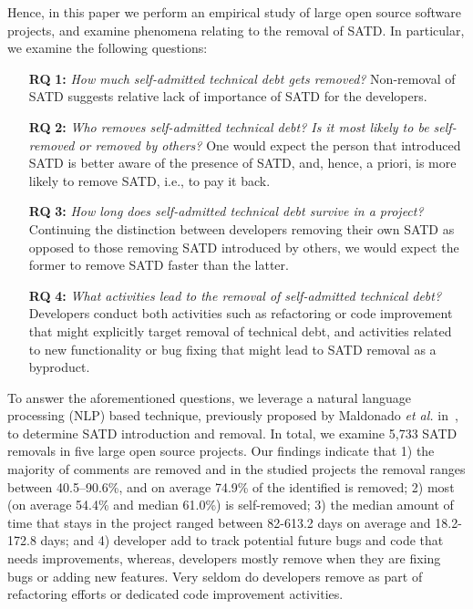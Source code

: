 Hence, in this paper we perform an empirical study of large open source software projects, and examine phenomena relating to the removal of SATD. In particular, we examine the following questions:
\begin{itemize}
	\item[\textbf{RQ}]\textbf{1:} \emph{How much self-admitted technical debt gets removed?} Non-removal of SATD suggests relative lack of importance of SATD for the developers. 
	\item[\textbf{RQ}]\textbf{2:} \emph{Who removes self-admitted technical debt? Is it most likely to be self-removed or removed by others?} One would expect the person that introduced SATD is better aware of the presence of SATD, and, hence, a priori, is more likely to remove SATD, i.e., to pay it back.
	\item[\textbf{RQ}]\textbf{3:} \emph{How long does self-admitted technical debt survive in a project?} Continuing the distinction between developers removing their own SATD as opposed to those removing SATD introduced by others, we would expect the former to remove SATD faster than the latter.
	\item[\textbf{RQ}]\textbf{4:} \emph{What activities lead to the removal of self-admitted technical debt?} Developers conduct both activities such as refactoring or code improvement that might explicitly target removal of technical debt, and activities related to new functionality or bug fixing that might lead to SATD removal as a byproduct.
\end{itemize}

To answer the aforementioned questions, we leverage a natural language processing (NLP) based technique, previously proposed by Maldonado \emph{et al.} in~\cite{Maldonado2015TSE}, to determine SATD introduction and removal. In total, we examine 5,733 SATD removals in five large open source projects. Our findings indicate that 1) the majority of \SATD comments are removed and in the studied projects the removal ranges between 40.5--90.6\%, and on average 74.9\% of the identified \SATD is removed; 2) most \SATD (on average 54.4\% and median 61.0\%) is self-removed; 3) the median amount of time that \SATD stays in the project ranged between 82-613.2 days on average and 18.2-172.8 days; and 4) developer add \SATD to track potential future bugs and code that needs improvements, whereas, developers mostly remove \SATD when they are fixing bugs or adding new features. Very seldom do developers remove \SATD as part of refactoring efforts or dedicated code improvement activities.

